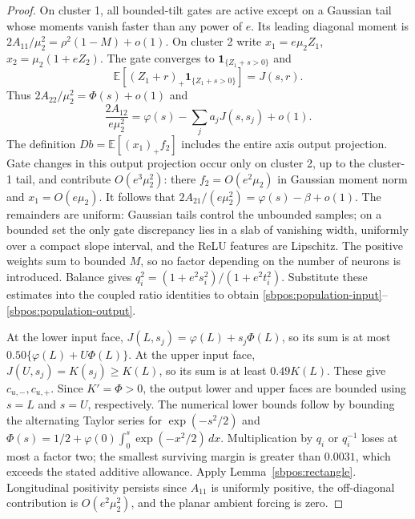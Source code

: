 \documentclass{article} %
\theoremstyle{plain}
\theoremstyle{definition}
\theoremstyle{remark}
\begin{document}
\begin{proof}
On cluster 1, all bounded-tilt gates are active except on a Gaussian tail
whose moments vanish faster than any power of $e$.
Its leading diagonal moment is
$2A_{11}/\mu_2^2=\rho^2(1-M)+o(1)$.
On cluster 2 write $x_1=e\mu_2Z_1$, $x_2=\mu_2(1+eZ_2)$.
The gate converges to $\mathbf1_{\{Z_1+s>0\}}$ and
\[
 \mathbb E[(Z_1+r)_+\mathbf1_{\{Z_1+s>0\}}]=J(s,r).
\]
Thus $2A_{22}/\mu_2^2=\Phi(s)+o(1)$ and
\[
 \frac{2A_{12}}{e\mu_2^2}
   =\varphi(s)-\sum_j a_jJ(s,s_j)+o(1).
\]
The definition $Db=\mathbb E[(x_1)_+f_2]$ includes the entire axis
output projection. Gate changes in this output projection occur only
on cluster 2, up to the cluster-1 tail, and contribute $O(e^3\mu_2^2)$:
there $f_2=O(e^2\mu_2)$ in Gaussian moment norm and $x_1=O(e\mu_2)$.
It follows that
$2A_{21}/(e\mu_2^2)=\varphi(s)-\beta+o(1)$.
The remainders are uniform: Gaussian tails control the unbounded samples;
on a bounded set the only gate discrepancy lies in a slab of vanishing
width, uniformly over a compact slope interval, and the ReLU features
are Lipschitz. The positive weights sum to bounded $M$, so no factor
depending on the number of neurons is introduced.
Balance gives
$q_i^2=(1+e^2s_i^2)/(1+e^2t_i^2)$.
Substitute these estimates into the coupled ratio identities to obtain
\eqref{sbpos:population-input}--\eqref{sbpos:population-output}.

At the lower input face, $J(L,s_j)=\varphi(L)+s_j\Phi(L)$,
so its sum is at most $0.50\{\varphi(L)+U\Phi(L)\}$.
At the upper input face, $J(U,s_j)=K(s_j)\ge K(L)$,
so its sum is at least $0.49K(L)$.
These give $c_{u,-},c_{u,+}$. Since $K'=\Phi>0$, the output lower
and upper faces are bounded using $s=L$ and $s=U$, respectively.
The numerical lower bounds follow by bounding the alternating Taylor
series for $\exp(-s^2/2)$ and
$\Phi(s)=1/2+\varphi(0)\int_0^s\exp(-x^2/2)\,dx$.
Multiplication by $q_i$ or $q_i^{-1}$ loses at most a factor two;
the smallest surviving margin is greater than $0.0031$, which exceeds
the stated additive allowance. Apply Lemma~\ref{sbpos:rectangle}.
Longitudinal positivity persists since $A_{11}$ is uniformly positive,
the off-diagonal contribution is $O(e^2\mu_2^2)$, and the planar
ambient forcing is zero.
\end{proof}
\end{document}
